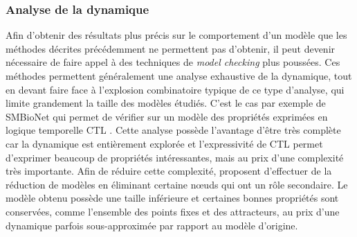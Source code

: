 % 
% 

\subsubsection*{Analyse de la dynamique}
Afin d'obtenir des résultats plus précis sur le comportement d'un modèle
que les méthodes décrites précédemment ne permettent pas d'obtenir,
il peut devenir nécessaire de faire appel à des techniques
de \textit{model checking} plus poussées.
Ces méthodes permettent généralement une analyse exhaustive de la dynamique,
tout en devant faire face à l'explosion combinatoire typique de ce type d'analyse,
qui limite grandement la taille des modèles étudiés.
C'est le cas par exemple de SMBioNet \cite{Richard06} qui permet de vérifier sur un modèle
des propriétés exprimées en logique temporelle CTL \cite{Clarke82}.
Cette analyse possède l'avantage d'être très complète
car la dynamique est entièrement explorée et l'expressivité de CTL permet
d'exprimer beaucoup de propriétés intéressantes,
mais au prix d'une complexité très importante.
Afin de réduire cette complexité,
 proposent d'effectuer de la réduction de modèles
en éliminant certaine nœuds qui ont un rôle secondaire.
Le modèle obtenu possède une taille inférieure et certaines bonnes propriétés sont conservées,
comme l'ensemble des points fixes et des attracteurs,
au prix d'une dynamique parfois sous-approximée par rapport au modèle d'origine.


% 
% 
% 
% 
% 
